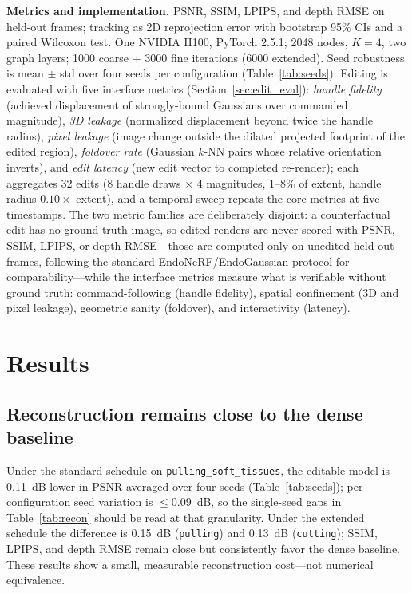 \documentclass[ASNA,twocolumn]{USG} %
\begin{document}
\textbf{Metrics and implementation.} PSNR, SSIM, LPIPS, and depth RMSE on held-out frames; tracking as 2D reprojection error with bootstrap 95\% CIs and a paired Wilcoxon test. One NVIDIA H100, PyTorch 2.5.1; 2048 nodes, $K=4$, two graph layers; 1000 coarse + 3000 fine iterations (6000 extended). Seed robustness is mean $\pm$ std over four seeds per configuration (Table~\ref{tab:seeds}). Editing is evaluated with five interface metrics (Section~\ref{sec:edit_eval}): \emph{handle fidelity} (achieved displacement of strongly-bound Gaussians over commanded magnitude), \emph{3D leakage} (normalized displacement beyond twice the handle radius), \emph{pixel leakage} (image change outside the dilated projected footprint of the edited region), \emph{foldover rate} (Gaussian $k$-NN pairs whose relative orientation inverts), and \emph{edit latency} (new edit vector to completed re-render); each aggregates 32 edits (8 handle draws $\times$ 4 magnitudes, 1--8\% of extent, handle radius $0.10\times$ extent), and a temporal sweep repeats the core metrics at five timestamps. The two metric families are deliberately disjoint: a counterfactual edit has no ground-truth image, so edited renders are never scored with PSNR, SSIM, LPIPS, or depth RMSE---those are computed only on unedited held-out frames, following the standard EndoNeRF/EndoGaussian protocol for comparability---while the interface metrics measure what is verifiable without ground truth: command-following (handle fidelity), spatial confinement (3D and pixel leakage), geometric sanity (foldover), and interactivity (latency).

\section{Results}\label{sec5}

\subsection{Reconstruction remains close to the dense baseline}

Under the standard schedule on \texttt{pulling\_soft\_tissues}, the editable model is 0.11~dB lower in PSNR averaged over four seeds (Table~\ref{tab:seeds}); per-configuration seed variation is $\leq 0.09$~dB, so the single-seed gaps in Table~\ref{tab:recon} should be read at that granularity. Under the extended schedule the difference is 0.15~dB (\texttt{pulling}) and 0.13~dB (\texttt{cutting}); SSIM, LPIPS, and depth RMSE remain close but consistently favor the dense baseline. These results show a small, measurable reconstruction cost---not numerical equivalence.
\end{document}
